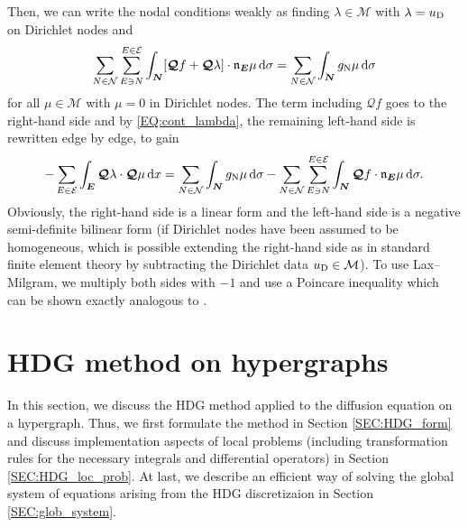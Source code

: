 \documentclass[a4paper, english, 12pt, reqno, draft]{amsart}
\theoremstyle{definition}
\theoremstyle{remark}
\numberwithin{equation}{section}
\newcommand{\setEdge}{\ensuremath{\mathcal E}}
\newcommand{\setNode}{\ensuremath{\mathcal N}}
\newcommand{\edge}{\ensuremath{E}}
\newcommand{\node}{\ensuremath{N}}
\newcommand{\Edge}{{\ensuremath{\boldsymbol E}}}
\newcommand{\Node}{{\ensuremath{\boldsymbol N}}}
\newcommand{\Normal}{\ensuremath{\mathfrak n_\Edge}}
\newcommand{\skeletalSpaceCont}{\ensuremath{\mathcal M}}
\renewcommand{\vec}[1]{\ensuremath{\boldsymbol{#1}}}
\newcommand{\dx}{\ensuremath{\, \textup d x}}
\newcommand{\ds}{\ensuremath{\, \textup d \sigma}}
\newcommand{\localQ}{\ensuremath{\vec{\mathcal Q}}}
\begin{document}
Then, we can write the nodal conditions weakly as finding $\lambda \in \skeletalSpaceCont$ with $\lambda = u_\text D$ on Dirichlet nodes and
% 
\begin{equation}
 \sum_{\node \in \setNode} \sum_{\edge \ni \node}^{\edge \in \setEdge} \int_\Node [\localQ f + \localQ \lambda] \cdot \Normal \mu \ds = \sum_{\node \in \setNode} \int_\Node g_\text N \mu \ds
\end{equation}
% 
for all $\mu \in \skeletalSpaceCont$ with $\mu = 0$ in Dirichlet nodes. The term including $\localQ f$ goes to the right-hand side and by \eqref{EQ:cont_lambda}, the remaining left-hand side is rewritten edge by edge, to gain
% 
\begin{equation}
 - \sum_{\edge \in \setEdge} \int_\Edge \localQ \lambda \cdot \localQ \mu \dx = \sum_{\node \in \setNode} \int_\Node g_\text N \mu \ds - \sum_{\node \in \setNode} \sum_{\edge \ni \node}^{\edge \in \setEdge} \int_\Node \localQ f \cdot \Normal \mu \ds.
\end{equation}
% 
Obviously, the right-hand side is a linear form and the left-hand side is a negative semi-definite bilinear form (if Dirichlet nodes have been assumed to be homogeneous, which is possible extending the right-hand side as in standard finite element theory by subtracting the Dirichlet data $u_\textup D \in \skeletalSpaceCont$). To use Lax--Milgram, we multiply both sides with $-1$ and use a Poincare inequality which can be shown exactly analogous to \cite[Satz 6.21]{Dobrowolski2010}.
% 
\section{HDG method on hypergraphs}\label{SEC:hdg_graph}
%
In this section, we discuss the HDG method applied to the diffusion equation on a hypergraph. Thus, we first formulate the method in Section \ref{SEC:HDG_form} and discuss implementation aspects of local problems (including transformation rules for the necessary integrals and differential operators) in Section \ref{SEC:HDG_loc_prob}. At last, we describe an efficient way of solving the global system of equations arising from the HDG discretizaion in Section \ref{SEC:glob_system}.
% 
\end{document}
